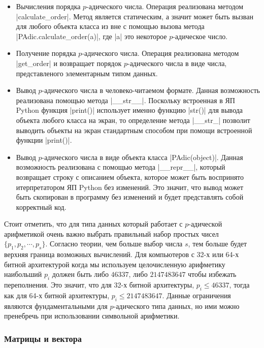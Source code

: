 \documentclass[master, och, diploma, times]{sty/SCWorks}
\theoremstyle{plain}
\theoremstyle{definition}
\numberwithin{equation}{section}
\begin{document}
\begin{itemize}
\item Вычисления порядка $p$-адического числа. Операция реализована методом |calculate_order|. Метод является статическим, а значит может быть вызван для любого объекта класса из вне с помощью вызова метода |PAdic.calculate_order(a)|, где |a| это некоторое $p$-адическое число.
\item Получение порядка $p$-адического числа. Операция реализована методом |get_order| и возвращает порядок $p$-адического числа в виде числа, представленого элементарным типом данных.
\item Вывод $p$-адического числа в человеко-читаемом формате. Данная возможность реализована  помощью метода |__str__|. Поскольку встроенная в ЯП Python функция |print()| использует именно функцию |str()| для вывода объекта любого класса на экран, то определение метода |__str_| позволит выводить объекты на экран стандартным способом при помощи встроенной функции  |print()|.
\item Вывод $p$-адического числа в виде объекта класса |PAdic(object)|. Данная возможность реализована с помощью метода |__repr__|, который возвращает строку с описанием объекта, которое может быть воспринято итерпретатором ЯП Python без изменений. Это значит, что вывод может быть скопирован в программу без изменений и будет представлять собой корректный код. 
\end{itemize}

Стоит отметить, что для типа данных который работает с $p$-адической арифметикой очень важно выбрать правильный набор простых чисел $\{ p_1, p_2, \cdots, p_s \}$. Согласно теории, чем больше выбор числа $s$, тем больше будет верхняя граница возможных вычислений. Для компьютеров с 32-х или 64-х битной архитектурой когда мы используем целочисленную арифметику наибольший $p_i$ должен быть либо  $46337$, либо  $2147483647$ чтобы избежать переполнения. Это значит, что для 32-х битной архитектуры, $p_i \leq 46337$, тогда как для 64-х битной архитектуры, $p_i \leq 2147483647$. Данные ограничения являются фундаментальными для $p$-адического типа данных, но ими можно пренебречь при использовании символьной арифметики.


\subsubsection{Матрицы и вектора}
\end{document}
